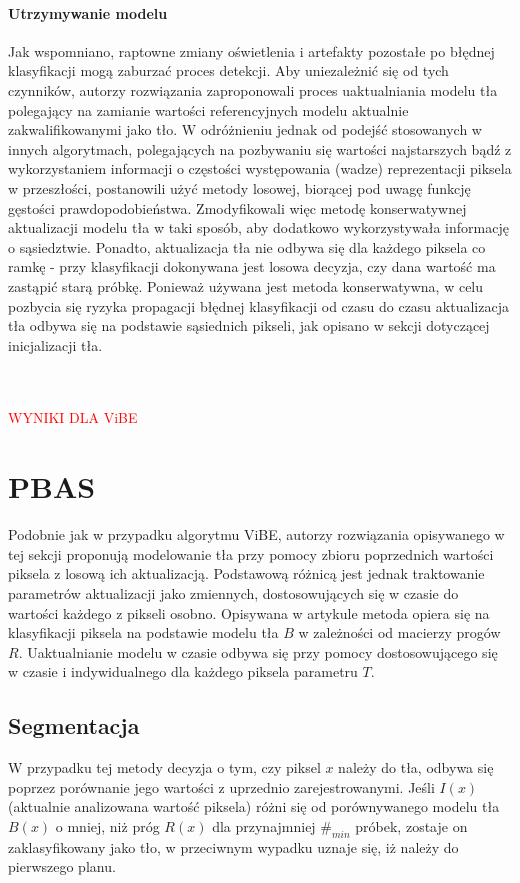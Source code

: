 \paragraph{Utrzymywanie modelu \\}
Jak wspomniano, raptowne zmiany oświetlenia i artefakty pozostałe po błędnej klasyfikacji mogą zaburzać proces detekcji. Aby uniezależnić się od tych czynników, autorzy rozwiązania zaproponowali proces uaktualniania modelu tła polegający na zamianie wartości referencyjnych modelu aktualnie zakwalifikowanymi jako tło. W odróżnieniu jednak od podejść stosowanych w innych algorytmach, polegających na pozbywaniu się wartości najstarszych bądź z wykorzystaniem informacji o częstości występowania (wadze) reprezentacji piksela w przeszłości, postanowili użyć metody losowej, biorącej pod uwagę funkcję gęstości prawdopodobieństwa. Zmodyfikowali więc metodę konserwatywnej aktualizacji modelu tła w taki sposób, aby dodatkowo wykorzystywała informację o sąsiedztwie. Ponadto, aktualizacja tła nie odbywa się dla każdego piksela co ramkę - przy klasyfikacji dokonywana jest losowa decyzja, czy dana wartość ma zastąpić starą próbkę. Ponieważ używana jest metoda konserwatywna, w celu pozbycia się ryzyka propagacji błędnej klasyfikacji od czasu do czasu aktualizacja tła odbywa się na podstawie sąsiednich pikseli, jak opisano w sekcji dotyczącej inicjalizacji tła.\\ \\ \\
\begin{LARGE}
\textcolor{red}{WYNIKI DLA ViBE}
\end{LARGE}
\section{PBAS}
Podobnie jak w przypadku algorytmu ViBE, autorzy rozwiązania opisywanego w tej sekcji proponują modelowanie tła przy pomocy zbioru poprzednich wartości piksela z losową ich aktualizacją. Podstawową różnicą jest jednak traktowanie parametrów aktualizacji jako zmiennych, dostosowujących się w czasie do wartości każdego z pikseli osobno. Opisywana w artykule \cite{hofmann2012background} metoda opiera się na klasyfikacji piksela na podstawie modelu tła $B$ w zależności od macierzy progów $R$. Uaktualnianie modelu w czasie odbywa się przy pomocy dostosowującego się w czasie i indywidualnego dla każdego piksela parametru $T$.
\subsection{Segmentacja}
W przypadku tej metody decyzja o tym, czy piksel $x$ należy do tła, odbywa się poprzez porównanie jego wartości z uprzednio zarejestrowanymi. Jeśli $I(x)$ (aktualnie analizowana wartość piksela) różni się od porównywanego modelu tła $B(x)$ o mniej, niż próg $R(x)$ dla przynajmniej $\#_{min}$ próbek, zostaje on zaklasyfikowany jako tło, w przeciwnym wypadku uznaje się, iż należy do pierwszego planu.
